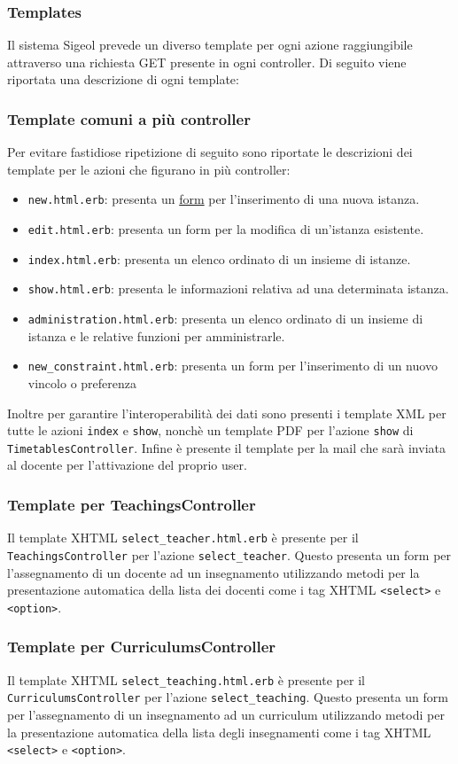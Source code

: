 \documentclass[11pt,a4paper]{article}
\begin{document}
\subsubsection{Templates}
Il sistema Sigeol prevede un diverso template per ogni azione raggiungibile attraverso una richiesta GET presente in ogni controller. Di seguito viene riportata una descrizione di ogni template:
\subsubsection*{Template comuni a più controller}
Per evitare fastidiose ripetizione di seguito sono riportate le descrizioni dei template per le azioni che figurano in più controller:
\begin{itemize}
 \item \verb|new.html.erb|: presenta un \underline{form} per l'inserimento di una nuova istanza.
 \item \verb|edit.html.erb|: presenta un form per la modifica di un'istanza esistente.
 \item \verb|index.html.erb|: presenta un elenco ordinato di un insieme di istanze.
 \item \verb|show.html.erb|: presenta le informazioni relativa ad una determinata istanza.
 \item \verb|administration.html.erb|: presenta un elenco ordinato di un insieme di istanza e le relative funzioni
 per amministrarle.
 \item \verb|new_constraint.html.erb|: presenta un form per l'inserimento di un nuovo vincolo o preferenza
\end{itemize}
Inoltre per garantire l'interoperabilità dei dati sono presenti i template XML per tutte le azioni \verb|index| e \verb|show|, nonchè un template PDF per l'azione \verb|show| di \verb|TimetablesController|. Infine è presente il template per la mail che sarà inviata al docente per l'attivazione del proprio user.
\subsubsection*{Template per TeachingsController}
Il template XHTML \verb|select_teacher.html.erb| è presente per il \\ \verb|TeachingsController| per l'azione \verb|select_teacher|.  Questo presenta un form per l'assegnamento di un docente ad un insegnamento utilizzando metodi per la presentazione automatica della lista dei docenti come i tag XHTML \verb|<select>| e \verb|<option>|.
\subsubsection*{Template per CurriculumsController}
Il template XHTML \verb|select_teaching.html.erb| è presente per il \\ \verb|CurriculumsController| per l'azione \verb|select_teaching|.  Questo presenta un form per l'assegnamento di un insegnamento ad un curriculum utilizzando metodi per la presentazione automatica della lista degli insegnamenti come i tag XHTML \verb|<select>| e \verb|<option>|.
\end{document}
